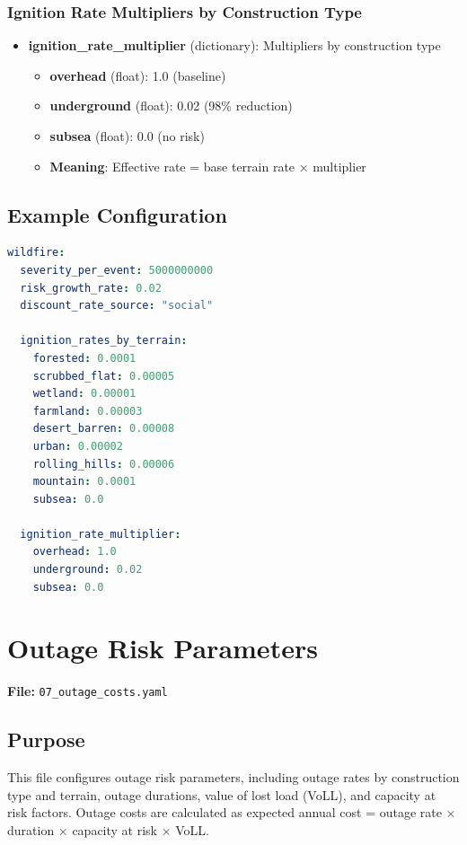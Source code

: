 \documentclass[ctcc_full_documentation.tex]{subfiles}
\begin{document}
\subsubsection{Ignition Rate Multipliers by Construction Type}

\begin{itemize}
    \item \textbf{ignition\_rate\_multiplier} (dictionary): Multipliers by construction type
    \begin{itemize}
        \item \textbf{overhead} (float): 1.0 (baseline)
        \item \textbf{underground} (float): 0.02 (98\% reduction)
        \item \textbf{subsea} (float): 0.0 (no risk)
        \item \textbf{Meaning}: Effective rate = base terrain rate × multiplier
    \end{itemize}
\end{itemize}

\subsection{Example Configuration}

\begin{lstlisting}[language=yaml]
wildfire:
  severity_per_event: 5000000000
  risk_growth_rate: 0.02
  discount_rate_source: "social"

  ignition_rates_by_terrain:
    forested: 0.0001
    scrubbed_flat: 0.00005
    wetland: 0.00001
    farmland: 0.00003
    desert_barren: 0.00008
    urban: 0.00002
    rolling_hills: 0.00006
    mountain: 0.0001
    subsea: 0.0

  ignition_rate_multiplier:
    overhead: 1.0
    underground: 0.02
    subsea: 0.0
\end{lstlisting}

\section{Outage Risk Parameters}
\label{sec:outage}

\textbf{File:} \texttt{07\_outage\_costs.yaml}

\subsection{Purpose}

This file configures outage risk parameters, including outage rates by construction type and terrain, outage durations, value of lost load (VoLL), and capacity at risk factors. Outage costs are calculated as expected annual cost = outage rate × duration × capacity at risk × VoLL.
\end{document}

